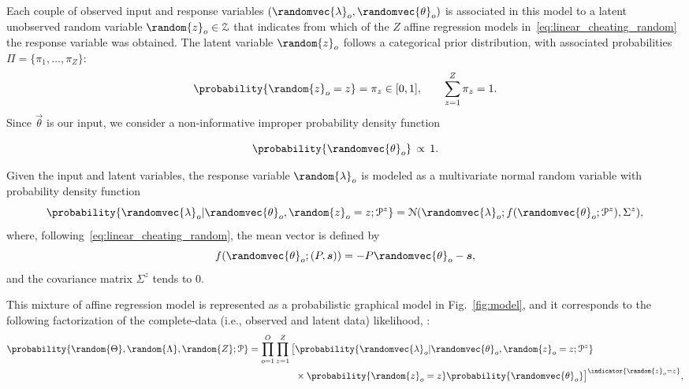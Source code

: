 \documentclass[../main.tex]{subfiles}
\begin{document}
Each couple of observed input and response variables $(    \randomvec{\lambda}_{o}, \randomvec{\theta}_{o})$ is associated in this model to a latent unobserved random variable ${\random{z}_{o}\in\set{Z}}$ that indicates from which of the $Z$ affine regression models in~\eqref{eq:linear_cheating_random} the response variable was obtained.
The latent variable $\random{z}_{o}$ follows a categorical prior distribution, with associated probabilities ${\Pi=\{\pi_{1},\dots,\pi_{Z}\}}$:
\begin{equation}
  \label{eq:prob_zo_equal_z}
  \probability{\random{z}_{o}=z}=\pi_{z} \in [0,1], \qquad \sum_{z=1}^{Z} \pi_{z} = 1.
\end{equation}
Since $\vec{\theta}$ is our input,
we consider a non-informative improper probability density function~\cite{ChristensenEtAl2010}

\begin{equation}
  \label{eq:theta_almost_surely}
  \probability{\randomvec{\theta}_{o}} \,\propto \,1.
\end{equation}

Given the input and latent variables, the response variable $\random{\lambda}_{o}$ is modeled as a multivariate normal random variable with probability density function
\begin{equation}
  \label{eq:multivariate_gaussian}
  \probability{\randomvec{\lambda}_{o}|\randomvec{\theta}_{o},\random{z}_{o}=z; \set{P}^{z}} = \mathcal{N}(\randomvec{\lambda}_{o};f(\randomvec{\theta}_{o};\set{P}^{z}),{\Sigma^{z}}),
\end{equation}
where, following~\eqref{eq:linear_cheating_random}, the mean vector is defined by
\[f(\randomvec{\theta}_{o};(P,\vec{s}))=-{P}\randomvec{\theta}_{o}-{\vec{s}},\]
and the covariance matrix ${\Sigma^{z}}$ tends to $0$.

This mixture of affine regression model is represented as a probabilistic graphical model in Fig.~\ref{fig:model}, and it corresponds to the following factorization of the complete-data (i.e., observed and latent data) likelihood, \cite{Bishop2006}:
\begin{align}\label{eq:completedataLikelihood}
  \probability{\random{\Theta},\random{\Lambda},\random{Z};\set{P}}= \prod_{o=1}^{O}\prod_{z=1}^{Z}\big[&\probability{\randomvec{\lambda}_{o}|\randomvec{\theta}_{o},\random{z}_{o}=z;\set{P}^{z}} \nonumber \\
                                                                                     & \times \probability{\random{z}_{o}=z}\probability{\randomvec{\theta}_{o}}\big]^{\indicator{\random{z}_{o}=z}},
\end{align}
\end{document}
